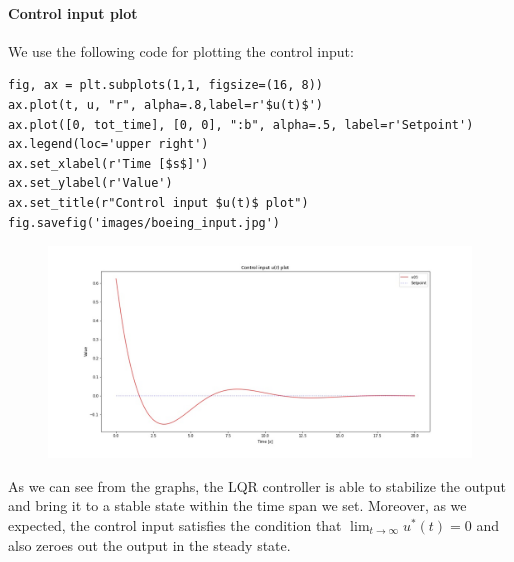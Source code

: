 \paragraph{Control input plot} We use the following code for plotting the control input:

\begin{verbatim}
fig, ax = plt.subplots(1,1, figsize=(16, 8))
ax.plot(t, u, "r", alpha=.8,label=r'$u(t)$')
ax.plot([0, tot_time], [0, 0], ":b", alpha=.5, label=r'Setpoint')
ax.legend(loc='upper right')
ax.set_xlabel(r'Time [$s$]')
ax.set_ylabel(r'Value')
ax.set_title(r"Control input $u(t)$ plot")
fig.savefig('images/boeing_input.jpg')
\end{verbatim}

\begin{figure}[h!]
    \centering
    \includegraphics[width=\linewidth]{images/boeing_input.jpg}
\end{figure}

As we can see from the graphs, the LQR controller is able to stabilize the output and bring it to a stable state within the time span we set. Moreover, as we expected, the control input satisfies the condition that $\lim_{t \to \infty} u^*(t) = 0$ and also zeroes out the output in the steady state.